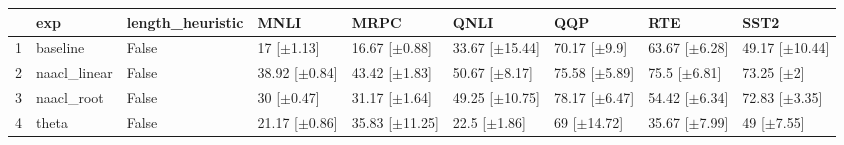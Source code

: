\begin{table}[ht]
\centering
\begin{tabular}{rllllllll}
  \hline
 & exp & length_heuristic & MNLI & MRPC & QNLI & QQP & RTE & SST2 \\ 
  \hline
1 & baseline & False & 17 [$\pm$1.13] & 16.67 [$\pm$0.88] & 33.67 [$\pm$15.44] & 70.17 [$\pm$9.9] & 63.67 [$\pm$6.28] & 49.17 [$\pm$10.44] \\ 
  2 & naacl_linear & False & 38.92 [$\pm$0.84] & 43.42 [$\pm$1.83] & 50.67 [$\pm$8.17] & 75.58 [$\pm$5.89] & 75.5 [$\pm$6.81] & 73.25 [$\pm$2] \\ 
  3 & naacl_root & False & 30 [$\pm$0.47] & 31.17 [$\pm$1.64] & 49.25 [$\pm$10.75] & 78.17 [$\pm$6.47] & 54.42 [$\pm$6.34] & 72.83 [$\pm$3.35] \\ 
  4 & theta & False & 21.17 [$\pm$0.86] & 35.83 [$\pm$11.25] & 22.5 [$\pm$1.86] & 69 [$\pm$14.72] & 35.67 [$\pm$7.99] & 49 [$\pm$7.55] \\ 
   \hline
\end{tabular}
\end{table}
